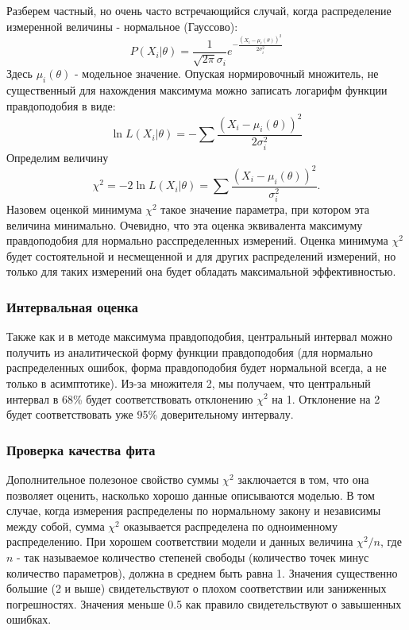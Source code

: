     Разберем частный, но очень часто встречающийся случай, когда
распределение измеренной величины - нормальное (Гауссово):
\begin{equation}
  P(X_i | \theta) = \frac{1}{\sqrt {2 \pi} \sigma_i} e^{- \frac{(X_i - \mu_i(\theta))^2}{2 \sigma_i^2}}
\end{equation} Здесь $\mu_i(\theta)$ - модельное значение. Опуская
нормировочный множитель, не существенный для нахождения максимума можно
записать логарифм функции правдоподобия в виде: \begin{equation}
  \ln L(X_i | \theta) = - \sum{\frac{(X_i - \mu_i(\theta))^2}{2 \sigma_i^2}}
\end{equation} Определим величину \begin{equation}
    \chi^2 = - 2 \ln L(X_i | \theta) =  \sum{\frac{(X_i - \mu_i(\theta))^2}{\sigma_i^2}}.
\end{equation} Назовем оценкой минимума $\chi^2$ такое значение
параметра, при котором эта величина минимально. Очевидно, что эта оценка
эквивалента максимуму правдоподобия для нормально расспределенных
измерений. Оценка минимума $\chi^2$ будет состоятельной и несмещенной
и для других распределений измерений, но только для таких измерений она
будет обладать максимальной эффективностью.

\subsubsection{Интервальная оценка}

Также как и в методе максимума правдоподобия, центральный интервал можно
получить из аналитической форму функции правдоподобия (для нормально
распределенных ошибок, форма правдоподобия будет нормальной всегда, а не
только в асимптотике). Из-за множителя 2, мы получаем, что центральный
интервал в 68\% будет соответствовать отклонению $\chi^2$ на 1.
Отклонение на 2 будет соответствовать уже 95\% доверительному интервалу.

\subsubsection{Проверка качества фита}

Дополнительное полезоное свойство суммы $\chi^2$ заключается в том,
что она позволяет оценить, насколько хорошо данные описываются моделью.
В том случае, когда измерения распределены по нормальному закону и
независимы между собой, сумма $\chi^2$ оказывается распределена по
{одноименному распределению}. При хорошем соответствии модели и данных величина
$\chi^2 / n $, где $n$ - так называемое количество степеней
свободы (количество точек минус количество параметров), должна в среднем
быть равна 1. Значения существенно большие (2 и выше) свидетельствуют о
плохом соответствии или заниженных погрешностях. Значения меньше 0.5 как
правило свидетельствуют о завышенных ошибках.


